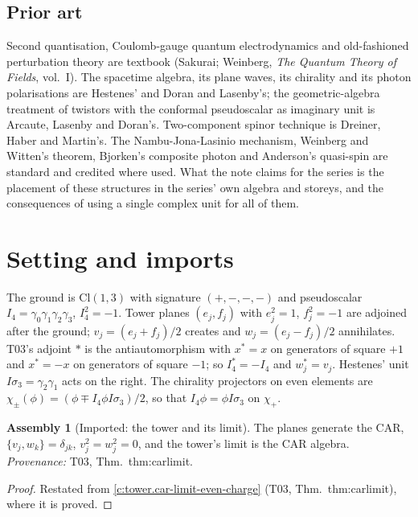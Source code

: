 \documentclass[11pt]{article}
\theoremstyle{definition}
\newtheorem{assembled}[theorem]{Assembly}
\theoremstyle{plain}
\providecommand{\Cl}{}\renewcommand{\Cl}{\mathrm{Cl}}
\providecommand{\IS}{}\renewcommand{\IS}{I\sigma_3}
\begin{document}
\subsection*{Prior art}
\label{c:note.field-theory.setting-prior-art}
Second quantisation, Coulomb-gauge quantum electrodynamics and old-fashioned perturbation theory are textbook (Sakurai; Weinberg, \emph{The Quantum Theory of Fields}, vol.~I). The spacetime algebra, its plane waves, its chirality and its photon polarisations are Hestenes' and Doran and Lasenby's; the geometric-algebra treatment of twistors with the conformal pseudoscalar as imaginary unit is Arcaute, Lasenby and Doran's. Two-component spinor technique is Dreiner, Haber and Martin's. The Nambu-Jona-Lasinio mechanism, Weinberg and Witten's theorem, Bjorken's composite photon and Anderson's quasi-spin are standard and credited where used. What the note claims for the series is the placement of these structures in the series' own algebra and storeys, and the consequences of using a single complex unit for all of them.

\section{Setting and imports}

\label{c:note.field-theory.setting-setting-imports}
The ground is $\Cl(1,3)$ with signature $(+,-,-,-)$ and pseudoscalar $I_4 = \gamma_0\gamma_1\gamma_2\gamma_3$, $I_4^2 = -1$. Tower planes $(e_j, f_j)$ with $e_j^2 = 1$, $f_j^2 = -1$ are adjoined after the ground; $v_j = (e_j + f_j)/2$ creates and $w_j = (e_j - f_j)/2$ annihilates. T03's adjoint $*$ is the antiautomorphism with $x^* = x$ on generators of square $+1$ and $x^* = -x$ on generators of square $-1$; so $I_4^* = -I_4$ and $w_j^* = v_j$. Hestenes' unit $\IS = \gamma_2\gamma_1$ acts on the right. The chirality projectors on even elements are $\chi_\pm(\phi) = (\phi \mp I_4\phi\IS)/2$, so that $I_4\phi = \phi\IS$ on $\chi_+$.

\begin{assembled}[Imported: the tower and its limit]\label{c:field-theory.imported-tower-limit}
The planes generate the CAR, $\{v_j, w_k\} = \delta_{jk}$, $v_j^2 = w_j^2 = 0$, and the tower's limit is the CAR algebra. \emph{Provenance:} T03, Thm.~thm:carlimit.
\end{assembled}
\begin{proof}
Restated from \ref{c:tower.car-limit-even-charge} (T03, Thm.~thm:carlimit), where it is proved.

\end{proof}
\end{document}

